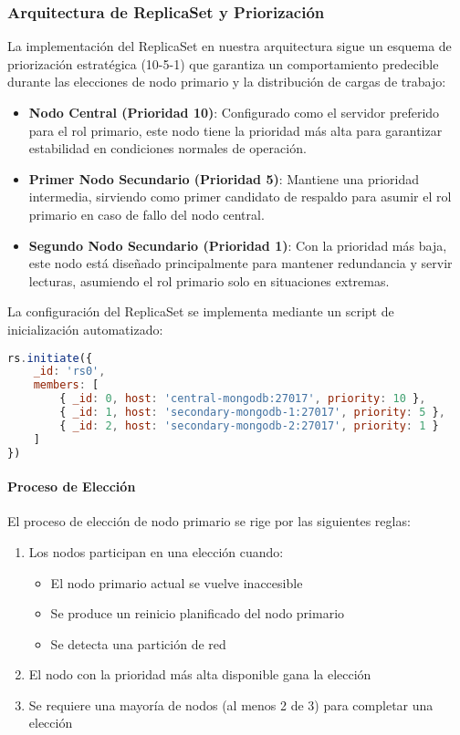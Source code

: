\documentclass[12pt,letterpaper]{article}
\begin{document}
\subsubsection{Arquitectura de ReplicaSet y Priorización}
La implementación del ReplicaSet en nuestra arquitectura sigue un esquema de priorización estratégica (10-5-1) que garantiza un comportamiento predecible durante las elecciones de nodo primario y la distribución de cargas de trabajo:

\begin{itemize}
    \item \textbf{Nodo Central (Prioridad 10)}: Configurado como el servidor preferido para el rol primario, este nodo tiene la prioridad más alta para garantizar estabilidad en condiciones normales de operación.
    \item \textbf{Primer Nodo Secundario (Prioridad 5)}: Mantiene una prioridad intermedia, sirviendo como primer candidato de respaldo para asumir el rol primario en caso de fallo del nodo central.
    \item \textbf{Segundo Nodo Secundario (Prioridad 1)}: Con la prioridad más baja, este nodo está diseñado principalmente para mantener redundancia y servir lecturas, asumiendo el rol primario solo en situaciones extremas.
\end{itemize}

La configuración del ReplicaSet se implementa mediante un script de inicialización automatizado:

\begin{lstlisting}[language=javascript]
rs.initiate({
    _id: 'rs0',
    members: [
        { _id: 0, host: 'central-mongodb:27017', priority: 10 },
        { _id: 1, host: 'secondary-mongodb-1:27017', priority: 5 },
        { _id: 2, host: 'secondary-mongodb-2:27017', priority: 1 }
    ]
})
\end{lstlisting}

\paragraph{Proceso de Elección}
El proceso de elección de nodo primario se rige por las siguientes reglas:

\begin{enumerate}
    \item Los nodos participan en una elección cuando:
        \begin{itemize}
            \item El nodo primario actual se vuelve inaccesible
            \item Se produce un reinicio planificado del nodo primario
            \item Se detecta una partición de red
        \end{itemize}
    \item El nodo con la prioridad más alta disponible gana la elección
    \item Se requiere una mayoría de nodos (al menos 2 de 3) para completar una elección
\end{enumerate}
\end{document}

